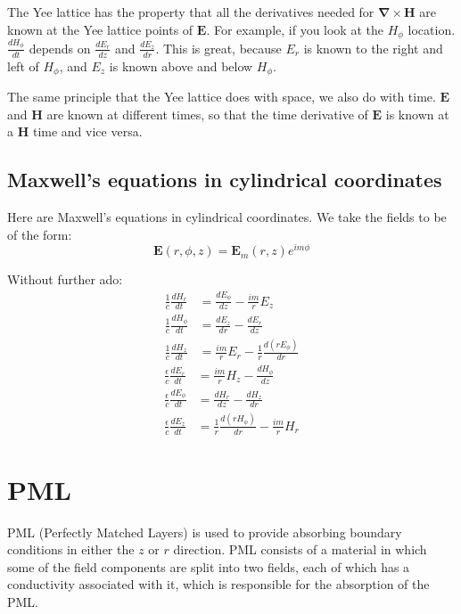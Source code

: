 \documentclass[floats]{book}
\begin{document}
The Yee lattice has the property that all the derivatives needed for
$\mathbf \nabla \times \mathbf H$ are known at the Yee lattice points of
$\mathbf E$.  For example, if you look at the $H_\phi$ location.
$\frac{dH_\phi}{dt}$ depends on $\frac{dE_r}{dz}$ and $\frac{dE_z}{dr}$.
This is great, because $E_r$ is known to the right and left of $H_\phi$,
and $E_z$ is known above and below $H_\phi$.

The same principle that the Yee lattice does with space, we also do with
time.  $\mathbf E$ and $\mathbf H$ are known at different times, so that
the time derivative of $\mathbf E$ is known at a $\mathbf H$ time and vice
versa.

\section{Maxwell's equations in cylindrical coordinates}

Here are Maxwell's equations in cylindrical coordinates.  We take the
fields to be of the form:
\begin{equation*}
\mathbf{E}(r,\phi,z) = \mathbf{E}_m(r,z)e^{i m \phi} 
\end{equation*}

Without further ado:
\begin{align}
\frac1c\frac{dH_r}{dt} &= \frac{dE_\phi}{dz} - \frac{im}r E_z\\
\frac1c\frac{dH_\phi}{dt} &= \frac{dE_z}{dr} - \frac{dE_r}{dz}\\
\frac1c\frac{dH_z}{dt} &= \frac{im}r E_r - \frac1r\frac{d(rE_\phi)}{dr}
\end{align}
\begin{align}
\frac\epsilon c\frac{dE_r}{dt} &= \frac{im}r H_z - \frac{dH_\phi}{dz} \\
\frac\epsilon c\frac{dE_\phi}{dt} &= \frac{dH_r}{dz} - \frac{dH_z}{dr} \\
\frac\epsilon c\frac{dE_z}{dt} &= \frac1r\frac{d(rH_\phi)}{dr} - \frac{im}r H_r
\end{align}


\chapter{PML}

PML (Perfectly Matched Layers) is used to provide absorbing boundary
conditions in either the $z$ or $r$ direction.  PML consists of a material
in which some of the field components are split into two fields, each of
which has a conductivity associated with it, which is responsible for the
absorption of the PML.
\end{document}
